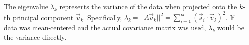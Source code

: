 \documentclass{report}
\begin{document}
The eigenvalue $\lambda_k$ represents the variance of the data when projected onto the $k$-th principal component $\vec{v}_k$. Specifically, $\lambda_k = ||A\vec{v}_k||^2 = \sum_{i=1}^{m} (\vec{s}_i \cdot \vec{v}_k)^2$. If data was mean-centered and the actual covariance matrix was used, $\lambda_k$ would be the variance directly.
\end{document}
